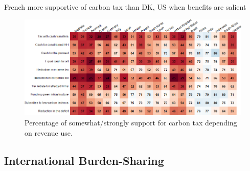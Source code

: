 \begin{framefont}{\small}
\begin{frame}{French more supportive of carbon tax than DK, US when benefits are salient}%
\begin{figure}[h!]
\centering

\caption{Percentage of somewhat/strongly support for carbon tax depending on revenue use.}
\includegraphics[width=\paperwidth]{../figures/country_comparison/tax_all_positive_countries.png}
\end{figure}
\end{frame}

\subsection{International Burden-Sharing}



\end{framefont}
